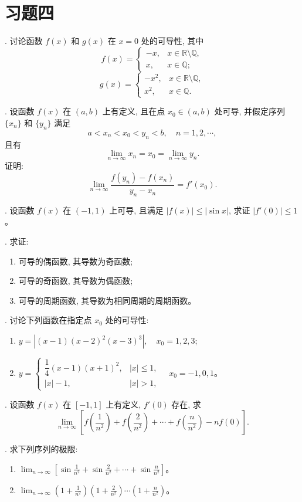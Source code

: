 \documentclass[UTF8,12pt,a4paper,fontset=fandol]{ctexart}
\begin{document}
\section*{习题四}

. 讨论函数 $f(x)$ 和 $g(x)$ 在 $x=0$ 处的可导性, 其中
\[
  f(x)=
  \begin{cases}
    -x, & x\in\mathbb R\setminus\mathbb Q,\\
    x, & x\in\mathbb Q;
  \end{cases}
\]
\[
  g(x)=
  \begin{cases}
    -x^2, & x\in\mathbb R\setminus\mathbb Q,\\
    x^2, & x\in\mathbb Q.
  \end{cases}
\]

. 设函数 $f(x)$ 在 $(a,b)$ 上有定义, 且在点 $x_0\in(a,b)$ 处可导, 并假定序列 $\{x_n\}$ 和 $\{y_n\}$ 满足
\[
  a<x_n<x_0<y_n<b,\quad n=1,2,\cdots,
\]
且有
\[
  \lim_{n\to\infty}x_n=x_0=\lim_{n\to\infty}y_n.
\]
证明:
\[
  \lim_{n\to\infty}\frac{f(y_n)-f(x_n)}{y_n-x_n}=f'(x_0).
\]

. 设函数 $f(x)$ 在 $(-1,1)$ 上可导, 且满足 $|f(x)|\leqslant|\sin x|$, 求证 $|f'(0)|\leqslant1$。

. 求证:
\begin{enumerate}
  \item 可导的偶函数, 其导数为奇函数;
  \item 可导的奇函数, 其导数为偶函数;
  \item 可导的周期函数, 其导数为相同周期的周期函数。
\end{enumerate}

. 讨论下列函数在指定点 $x_0$ 处的可导性:
\begin{enumerate}
  \item $y=|(x-1)(x-2)^2(x-3)^3|,\quad x_0=1,2,3$;
  \item
  $
  y=
  \begin{cases}
    \dfrac14(x-1)(x+1)^2, & |x|\leqslant1,\\
    |x|-1, & |x|>1,
  \end{cases}
  \quad x_0=-1,0,1
  $。
\end{enumerate}

. 设函数 $f(x)$ 在 $[-1,1]$ 上有定义, $f'(0)$ 存在, 求
\[
  \lim_{n\to\infty}
  \left[
    f\left(\frac1{n^2}\right)
    +
    f\left(\frac2{n^2}\right)
    +\cdots+
    f\left(\frac n{n^2}\right)
    -
    nf(0)
  \right].
\]

. 求下列序列的极限:
\begin{enumerate}
  \item
  $\displaystyle
  \lim_{n\to\infty}
  \left[
    \sin\frac1{n^2}+\sin\frac2{n^2}+\cdots+\sin\frac n{n^2}
  \right]
  $。
  \item
  $\displaystyle
  \lim_{n\to\infty}
  \left(1+\frac1{n^2}\right)
  \left(1+\frac2{n^2}\right)\cdots
  \left(1+\frac n{n^2}\right)
  $。
\end{enumerate}
\end{document}
